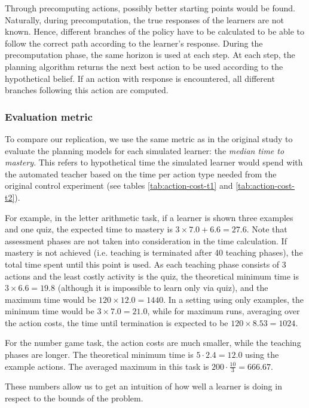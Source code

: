 Through precomputing actions, possibly better starting points would be found. Naturally, during precomputation, the true responses of the learners are not known. Hence, different branches of the policy have to be calculated to be able to follow the correct path according to the learner's response. During the precomputation phase, the same horizon is used at each step. At each step, the planning algorithm returns the next best action to be used according to the hypothetical belief. If an action with response is encountered, all different branches following this action are computed.

\subsubsection{Evaluation metric}

To compare our replication, we use the same metric as in the original study to evaluate the planning models for each simulated learner: the \textit{median time to mastery}.
This refers to hypothetical time the simulated learner would spend with the automated teacher based on the time per action type needed from the original control experiment (see tables \ref{tab:action-cost-t1} and \ref{tab:action-cost-t2}).

For example, in the letter arithmetic task, if a learner is shown three examples and one quiz, the expected time to mastery is $3 \times 7.0 + 6.6 = 27.6$. 
Note that assessment phases are not taken into consideration in the time calculation.
If mastery is not achieved (i.e. teaching is terminated after 40 teaching phases), the total time spent until this point is used. 
As each teaching phase consists of 3 actions and the least costly activity is the quiz, the theoretical minimum time is $3 \times 6.6 = 19.8$ (although it is impossible to learn only via quiz), and the maximum time would be $120 \times 12.0 = 1440$. 
In a setting using only examples, the minimum time would be $3 \times 7.0 = 21.0$, while for maximum runs, averaging over the action costs, the time until termination is expected to be $120 \times 8.53 = 1024$.


For the number game task, the action costs are much smaller, while the teaching phases are longer.
The theoretical minimum time is $5 \cdot 2.4 = 12.0$ using the example actions.
The averaged maximum in this task is $200 \cdot \frac{10}{3} = 666.67$.

These numbers allow us to get an intuition of how well a learner is doing in respect to the bounds of the problem.

